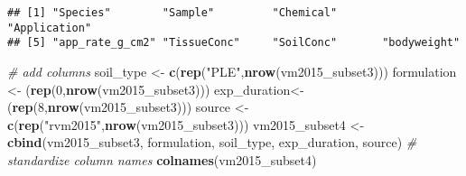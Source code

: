 \documentclass[
]{article}
\newenvironment{Shaded}{\begin{snugshade}}{\end{snugshade}}
\newcommand{\CommentTok}[1]{\textcolor[rgb]{0.56,0.35,0.01}{\textit{#1}}}
\newcommand{\DecValTok}[1]{\textcolor[rgb]{0.00,0.00,0.81}{#1}}
\newcommand{\KeywordTok}[1]{\textcolor[rgb]{0.13,0.29,0.53}{\textbf{#1}}}
\newcommand{\NormalTok}[1]{#1}
\newcommand{\OperatorTok}[1]{\textcolor[rgb]{0.81,0.36,0.00}{\textbf{#1}}}
\newcommand{\StringTok}[1]{\textcolor[rgb]{0.31,0.60,0.02}{#1}}
\begin{document}
\begin{Shaded}
\end{Shaded}

\begin{verbatim}
## [1] "Species"        "Sample"         "Chemical"       "Application"   
## [5] "app_rate_g_cm2" "TissueConc"     "SoilConc"       "bodyweight"
\end{verbatim}

\begin{Shaded}
\begin{Highlighting}[]
\CommentTok{# add columns}
\NormalTok{soil_type <-}\StringTok{ }\KeywordTok{c}\NormalTok{(}\KeywordTok{rep}\NormalTok{(}\StringTok{"PLE"}\NormalTok{,}\KeywordTok{nrow}\NormalTok{(vm2015_subset3)))}
\NormalTok{formulation <-}\StringTok{ }\NormalTok{(}\KeywordTok{rep}\NormalTok{(}\DecValTok{0}\NormalTok{,}\KeywordTok{nrow}\NormalTok{(vm2015_subset3)))}
\NormalTok{exp_duration<-}\StringTok{ }\NormalTok{(}\KeywordTok{rep}\NormalTok{(}\DecValTok{8}\NormalTok{,}\KeywordTok{nrow}\NormalTok{(vm2015_subset3)))}
\NormalTok{source <-}\StringTok{ }\KeywordTok{c}\NormalTok{(}\KeywordTok{rep}\NormalTok{(}\StringTok{"rvm2015"}\NormalTok{,}\KeywordTok{nrow}\NormalTok{(vm2015_subset3)))}
\NormalTok{vm2015_subset4 <-}\StringTok{ }\KeywordTok{cbind}\NormalTok{(vm2015_subset3, formulation, soil_type, exp_duration, source)}
\CommentTok{# standardize column names}
\KeywordTok{colnames}\NormalTok{(vm2015_subset4)}
\end{Highlighting}
\end{Shaded}
\end{document}
